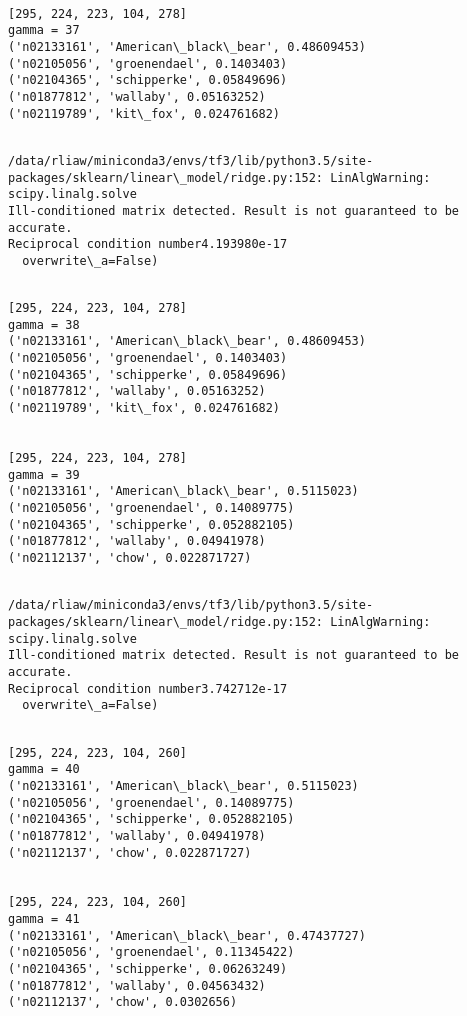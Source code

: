 \documentclass[11pt]{article}
\begin{document}
    \begin{Verbatim}[commandchars=\\\{\}]

[295, 224, 223, 104, 278]
gamma = 37
('n02133161', 'American\_black\_bear', 0.48609453)
('n02105056', 'groenendael', 0.1403403)
('n02104365', 'schipperke', 0.05849696)
('n01877812', 'wallaby', 0.05163252)
('n02119789', 'kit\_fox', 0.024761682)


    \end{Verbatim}

    \begin{Verbatim}[commandchars=\\\{\}]
/data/rliaw/miniconda3/envs/tf3/lib/python3.5/site-packages/sklearn/linear\_model/ridge.py:152: LinAlgWarning: scipy.linalg.solve
Ill-conditioned matrix detected. Result is not guaranteed to be accurate.
Reciprocal condition number4.193980e-17
  overwrite\_a=False)

    \end{Verbatim}

    \begin{Verbatim}[commandchars=\\\{\}]

[295, 224, 223, 104, 278]
gamma = 38
('n02133161', 'American\_black\_bear', 0.48609453)
('n02105056', 'groenendael', 0.1403403)
('n02104365', 'schipperke', 0.05849696)
('n01877812', 'wallaby', 0.05163252)
('n02119789', 'kit\_fox', 0.024761682)


[295, 224, 223, 104, 278]
gamma = 39
('n02133161', 'American\_black\_bear', 0.5115023)
('n02105056', 'groenendael', 0.14089775)
('n02104365', 'schipperke', 0.052882105)
('n01877812', 'wallaby', 0.04941978)
('n02112137', 'chow', 0.022871727)


    \end{Verbatim}

    \begin{Verbatim}[commandchars=\\\{\}]
/data/rliaw/miniconda3/envs/tf3/lib/python3.5/site-packages/sklearn/linear\_model/ridge.py:152: LinAlgWarning: scipy.linalg.solve
Ill-conditioned matrix detected. Result is not guaranteed to be accurate.
Reciprocal condition number3.742712e-17
  overwrite\_a=False)

    \end{Verbatim}

    \begin{Verbatim}[commandchars=\\\{\}]

[295, 224, 223, 104, 260]
gamma = 40
('n02133161', 'American\_black\_bear', 0.5115023)
('n02105056', 'groenendael', 0.14089775)
('n02104365', 'schipperke', 0.052882105)
('n01877812', 'wallaby', 0.04941978)
('n02112137', 'chow', 0.022871727)


[295, 224, 223, 104, 260]
gamma = 41
('n02133161', 'American\_black\_bear', 0.47437727)
('n02105056', 'groenendael', 0.11345422)
('n02104365', 'schipperke', 0.06263249)
('n01877812', 'wallaby', 0.04563432)
('n02112137', 'chow', 0.0302656)


    \end{Verbatim}
\end{document}
